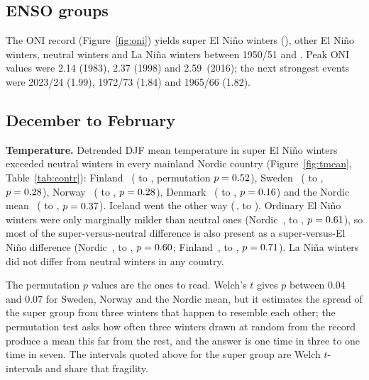 \subsection{ENSO groups}
The ONI record (Figure~\ref{fig:oni}) yields \nSuper{} super El Niño winters (\superWinters), \nElnino{} other El Niño winters, \nNeutral{} neutral winters and \nLanina{} La Niña winters between 1950/51 and \lastWinter. Peak ONI values were 2.14 (1983), 2.37 (1998) and 2.59\,\degC{} (2016); the next strongest events were 2023/24 (1.99), 1972/73 (1.84) and 1965/66 (1.82).

\subsection{December to February}
\textbf{Temperature.} Detrended DJF mean temperature in super El Niño winters exceeded neutral winters in every mainland Nordic country (Figure~\ref{fig:tmean}, Table~\ref{tab:contr}): Finland \fiTSvNdiff\,\degC{} (\fiTSvNlo{} to \fiTSvNhi, permutation $p = 0.52$), Sweden \seTSvNdiff\,\degC{} (\seTSvNlo{} to \seTSvNhi, $p = 0.28$), Norway \noTSvNdiff\,\degC{} (\noTSvNlo{} to \noTSvNhi, $p = 0.28$), Denmark \dkTSvNdiff\,\degC{} (\dkTSvNlo{} to \dkTSvNhi, $p = 0.16$) and the Nordic mean \nordicTSvNdiff\,\degC{} (\nordicTSvNlo{} to \nordicTSvNhi, $p = 0.37$). Iceland went the other way (\isTSvNdiff\,\degC, \isTSvNlo{} to \isTSvNhi). Ordinary El Niño winters were only marginally milder than neutral ones (Nordic \nordicTEvNdiff\,\degC, \nordicTEvNlo{} to \nordicTEvNhi, $p = 0.61$), so most of the super-versus-neutral difference is also present as a super-versus-El Niño difference (Nordic \nordicTSvEdiff\,\degC, \nordicTSvElo{} to \nordicTSvEhi, $p = 0.60$; Finland \fiTSvEdiff\,\degC, \fiTSvElo{} to \fiTSvEhi, $p = 0.71$). La Niña winters did not differ from neutral winters in any country.

The permutation $p$ values are the ones to read. Welch's $t$ gives $p$ between 0.04 and 0.07 for Sweden, Norway and the Nordic mean, but it estimates the spread of the super group from three winters that happen to resemble each other; the permutation test asks how often three winters drawn at random from the record produce a mean this far from the rest, and the answer is one time in three to one time in seven. The intervals quoted above for the super group are Welch $t$-intervals and share that fragility.

